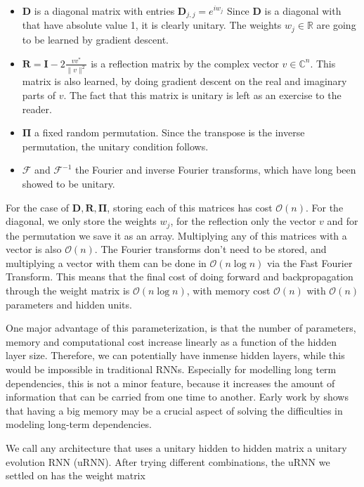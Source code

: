 \documentclass{article} %
\newcommand{\matr}[1]{\mathbf{#1}}
\newcommand\RR{\mathbb{R}}
\begin{document}
\begin{itemize}
  \item $\matr{D}$ is a diagonal matrix with entries $\matr{D}_{j,j} = e^{i w_j}$ Since $\matr{D}$ is a diagonal with that have absolute value 1, it is clearly unitary. The weights $w_j \in \RR$ are going to be learned by gradient descent.
  \item $\matr{R} = \matr{I} - 2 \frac{v v^*}{\|v\|^2}$ is a reflection matrix by the complex vector $v \in \mathbb{C}^n$. This matrix is also learned, by doing gradient descent on the real and imaginary parts of $v$. The fact that this matrix is unitary is left as an exercise to the reader.
  \item $\matr{\Pi}$ a fixed random permutation. Since the transpose is the inverse permutation, the unitary condition follows.
  \item $\mathcal{F}$ and $\mathcal{F}^{-1}$ the Fourier and inverse Fourier transforms, which have long been showed to be unitary.
\end{itemize}

For the case of $\matr{D}, \matr{R}, \matr{\Pi}$, storing each of this matrices has cost $\mathcal{O}(n)$. For the diagonal, we only store the weights $w_j$, for the reflection only the vector $v$ and for the permutation we save it as an array. Multiplying any of this matrices with a vector is also $\mathcal{O}(n)$. The Fourier transforms don't need to be stored, and multiplying a vector with them can be done in $\mathcal{O}(n \log n)$ via the Fast Fourier Transform. This means that the final cost of doing forward and backpropagation through the weight matrix is $\mathcal{O} (n \log n)$, with memory cost $\mathcal{O} (n)$ with $\mathcal{O}(n)$ parameters and hidden units.

One major advantage of this parameterization, is that the number of parameters, memory and computational cost increase linearly as a function of the hidden layer size. Therefore, we can potentially have inmense hidden layers, while this would be impossible in traditional RNNs. Especially for modelling long term dependencies, this is not a minor feature, because it increases the amount of information that can be carried from one time to another. Early work by \cite{Yoshua94} shows that having a big memory may be a crucial aspect of solving the difficulties in modeling long-term dependencies.

We call any architecture that uses a unitary hidden to hidden matrix a unitary evolution RNN (uRNN). After trying different combinations, the uRNN we settled on has the weight matrix
\end{document}
